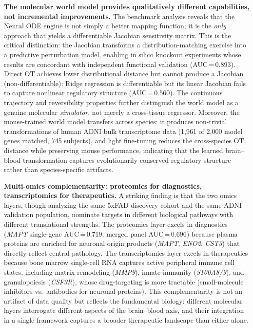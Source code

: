 \documentclass[12pt,a4paper]{article}
\begin{document}
\textbf{The molecular world model provides qualitatively different capabilities, not incremental improvements.}
The benchmark analysis reveals that the Neural ODE engine is not simply a better mapping function; it is the \emph{only} approach that yields a differentiable Jacobian sensitivity matrix. This is the critical distinction: the Jacobian transforms a distribution-matching exercise into a predictive perturbation model, enabling in silico knockout experiments whose results are concordant with independent functional validation (AUC\,=\,0.893). Direct OT achieves lower distributional distance but cannot produce a Jacobian (non-differentiable); Ridge regression is differentiable but its linear Jacobian fails to capture nonlinear regulatory structure (AUC\,=\,0.560). The continuous trajectory and reversibility properties further distinguish the world model as a genuine molecular \emph{simulator}, not merely a cross-tissue regressor. Moreover, the mouse-trained world model transfers across species: it produces non-trivial transformations of human ADNI bulk transcriptome data (1,961 of 2,000 model genes matched, 745 subjects), and light fine-tuning reduces the cross-species OT distance while preserving mouse performance, indicating that the learned brain--blood transformation captures evolutionarily conserved regulatory structure rather than species-specific artifacts.

\textbf{Multi-omics complementarity: proteomics for diagnostics, transcriptomics for therapeutics.}
A striking finding is that the two omics layers, though analyzing the same 5xFAD discovery cohort and the same ADNI validation population, nominate targets in different biological pathways with different translational strengths. The proteomics layer excels in diagnostics (\textit{MAPT} single-gene AUC\,=\,0.719; merged panel AUC\,=\,0.696) because plasma proteins are enriched for neuronal origin products (\textit{MAPT}, \textit{ENO2}, \textit{CST3}) that directly reflect central pathology. The transcriptomics layer excels in therapeutics because bone marrow single-cell RNA captures active peripheral immune cell states, including matrix remodeling (\textit{MMP9}), innate immunity (\textit{S100A8/9}), and granulopoiesis (\textit{CSF3R}), whose drug-targeting is more tractable (small-molecule inhibitors vs.\ antibodies for neuronal proteins). This complementarity is not an artifact of data quality but reflects the fundamental biology: different molecular layers interrogate different aspects of the brain--blood axis, and their integration in a single framework captures a broader therapeutic landscape than either alone.
\end{document}
